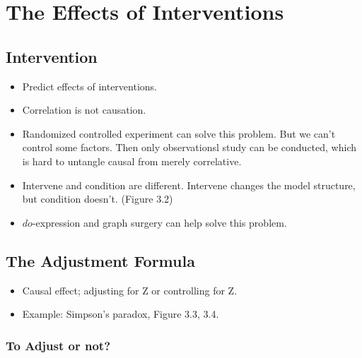 \documentclass[]{article}
\begin{document}
\section{The Effects of
Interventions}\label{the-effects-of-interventions}

\subsection{Intervention}\label{intervention}

\begin{itemize}
\item
  Predict effects of interventions.
\item
  Correlation is not causation.
\item
  Randomized controlled experiment can solve this problem. But we can't
  control some factors. Then only observationsl study can be conducted,
  which is hard to untangle causal from merely correlative.
\item
  Intervene and condition are different. Intervene changes the model
  structure, but condition doesn't. (Figure 3.2)
\item
  \(do\)-expression and graph surgery can help solve this problem.
\end{itemize}

\subsection{The Adjustment Formula}\label{the-adjustment-formula}

\begin{itemize}
\item
  Causal effect; adjusting for Z or controlling for Z.
\item
  Example: Simpson's paradox, Figure 3.3, 3.4.
\end{itemize}

\subsubsection{To Adjust or not?}\label{to-adjust-or-not}
\end{document}
